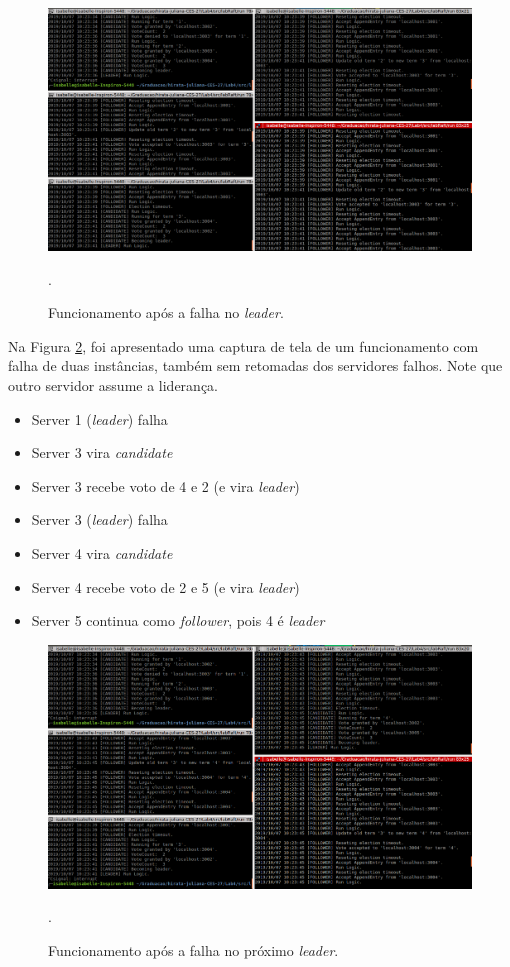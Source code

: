 \documentclass[journal,onecolumn]{IEEEtran}
\begin{document}
\begin{figure}[H]
\centering
\centerline{\includegraphics[scale=0.4]{imagens/1_falha.png}}
\caption{Funcionamento após a falha no \textit{leader}.}.
\label{1_falha}
\end{figure}

Na Figura \ref{2_falhas}, foi apresentado uma captura de tela de um funcionamento com falha de duas instâncias, também sem retomadas dos servidores falhos. Note que outro servidor assume a liderança.

\begin{itemize}
\item Server 1 (\textit{leader}) falha
\item Server 3 vira \textit{candidate}
\item Server 3 recebe voto de 4 e 2 (e vira \textit{leader})
\item Server 3 (\textit{leader}) falha
\item Server 4 vira \textit{candidate}
\item Server 4 recebe voto de 2 e 5 (e vira \textit{leader})
\item Server 5 continua como \textit{follower}, pois 4 é \textit{leader}
\end{itemize}

\begin{figure}[H]
\centering
\centerline{\includegraphics[scale=0.4]{imagens/2_falhas.png}}
\caption{Funcionamento após a falha no próximo \textit{leader}.}.
\label{2_falhas}
\end{figure}
\end{document}
